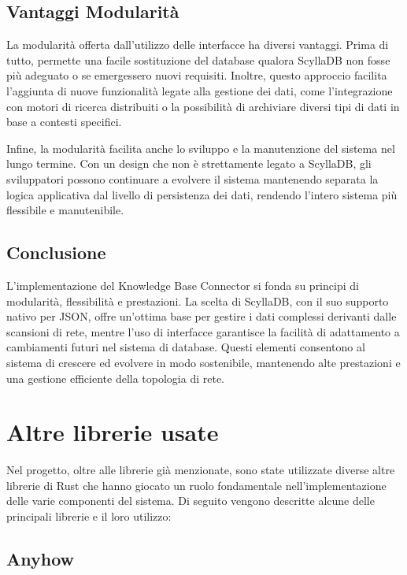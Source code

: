 \documentclass[target=bach,aauheader=,style=]{thud}
\begin{document}
\subsection{Vantaggi Modularità}
La modularità offerta dall'utilizzo delle interfacce ha diversi vantaggi. Prima di tutto, permette una facile sostituzione del database qualora ScyllaDB non fosse più adeguato o se emergessero nuovi requisiti. Inoltre, questo approccio facilita l’aggiunta di nuove funzionalità legate alla gestione dei dati, come l’integrazione con motori di ricerca distribuiti o la possibilità di archiviare diversi tipi di dati in base a contesti specifici.

Infine, la modularità facilita anche lo sviluppo e la manutenzione del sistema nel lungo termine. Con un design che non è strettamente legato a ScyllaDB, gli sviluppatori possono continuare a evolvere il sistema mantenendo separata la logica applicativa dal livello di persistenza dei dati, rendendo l'intero sistema più flessibile e manutenibile.

\subsection{Conclusione}
L'implementazione del Knowledge Base Connector si fonda su principi di modularità, flessibilità e prestazioni. La scelta di ScyllaDB, con il suo supporto nativo per JSON, offre un'ottima base per gestire i dati complessi derivanti dalle scansioni di rete, mentre l'uso di interfacce garantisce la facilità di adattamento a cambiamenti futuri nel sistema di database. Questi elementi consentono al sistema di crescere ed evolvere in modo sostenibile, mantenendo alte prestazioni e una gestione efficiente della topologia di rete.


\section{Altre librerie usate}
Nel progetto, oltre alle librerie già menzionate, sono state utilizzate diverse altre librerie di Rust che hanno giocato un ruolo fondamentale nell'implementazione delle varie componenti del sistema. Di seguito vengono descritte alcune delle principali librerie e il loro utilizzo:
\subsection{Anyhow}
\end{document}
